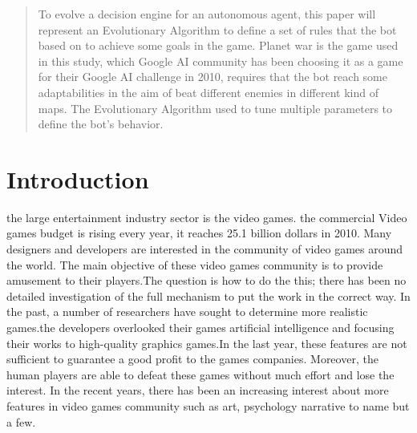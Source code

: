 \documentclass[conference]{IEEEtran}
\begin{document}




\maketitle

\begin{abstract}
To evolve a decision engine for an autonomous agent, this paper will represent an Evolutionary Algorithm to define a set of rules that the bot based on to achieve some goals in the game.  Planet war is the game used in this study, which Google AI community has been choosing it as a game for their Google AI challenge in 2010, requires that the bot reach some adaptabilities in the aim of beat different enemies in different kind of maps. The Evolutionary Algorithm used to tune multiple parameters to define the bot's behavior.
\end{abstract}





%
\IEEEpeerreviewmaketitle



\section{Introduction}
the large entertainment industry sector is the video games.
the commercial Video games budget is rising every year,
it reaches 25.1 billion dollars in 2010\cite{doc2}. Many designers and developers are interested in the community of video games around the world. The main objective of these video games community is to provide amusement to their players.The question is how to do the this; there has been no detailed investigation of the full mechanism to put the work in the correct way.\cite{doc5}
In the past, a number of researchers have sought to determine more realistic games.the developers overlooked their games artificial intelligence and focusing their works to high-quality graphics games.In the last year, these features are not sufficient to guarantee a good profit to the games companies. Moreover, the human players are able to defeat these games without much effort and lose the interest. In the recent years, there has been an increasing interest about more features in video games community such as art, psychology narrative to name but a few.\cite{doc5}  \\
\end{document}
